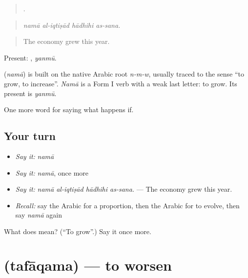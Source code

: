 \begin{quote}
   .
\end{quote}

\begin{quote}
\emph{namā al-iqtiṣād hādhihi as-sana.}
\end{quote}

\begin{quote}
The economy grew this year.
\end{quote}

Present: , \emph{yanmū}.

\begin{cousinweb}
\textbf{} (\emph{namā}) is built on the native Arabic root \emph{n-m-w}, usually traced to the sense \textquotedblleft{}to grow, to increase\textquotedblright{}. \emph{Namā} is a Form I verb with a weak last letter: to grow. Its present is \emph{yanmū}.
\end{cousinweb}

\begin{grammarlens}[title={What you've built}]
One more word for saying what happens if.
\end{grammarlens}

\subsection*{Your turn}
\begin{itemize}
\raggedright
  \item \emph{Say it:} \emph{namā}
  \item \emph{Say it:} \emph{namā}, once more
  \item \emph{Say it:} \emph{namā al-iqtiṣād hādhihi as-sana.} — The economy grew this year.
  \item \emph{Recall:} say the Arabic for a proportion, then the Arabic for to evolve, then say \emph{namā} again
\end{itemize}

\begin{tcolorbox}[breakable,colback=teal!4,colframe=teal!35!black,title={Before you move on}]
What does  mean? (\textquotedblleft{}To grow\textquotedblright{}.) Say it once more.
\end{tcolorbox}
\section[\texorpdfstring{\ar{تفاقم} (tafāqama)}{تفاقم (tafāqama)}]{ (tafāqama) — to worsen}

